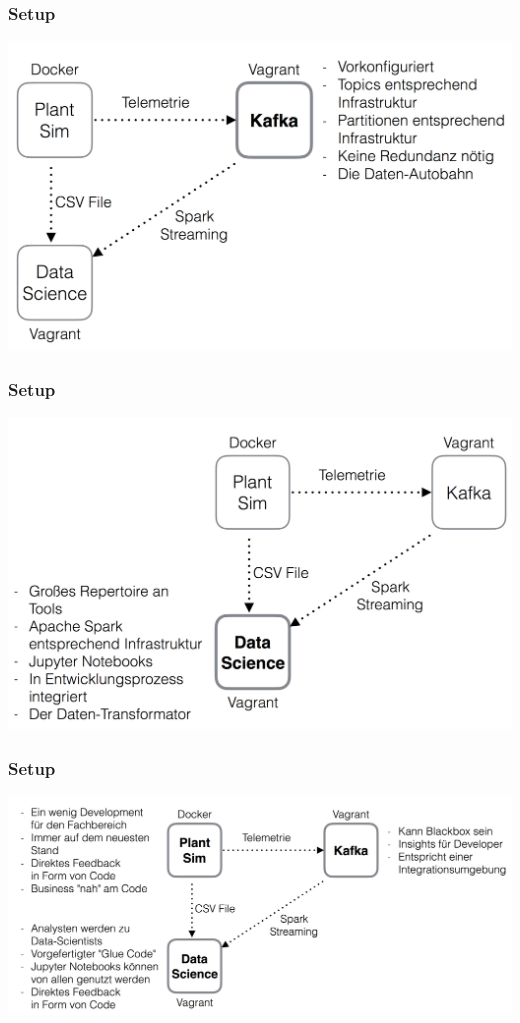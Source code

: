\begin{frame}
\frametitle{Setup}
  \center
  \includegraphics[width=1\textwidth,
  keepaspectratio=true]{bilder/data_science_kafka.png}
\end{frame}

\begin{frame}
\frametitle{Setup}
  \center
  \includegraphics[width=1\textwidth,
  keepaspectratio=true]{bilder/data_science_spark.png}
\end{frame}

\begin{frame}
\frametitle{Setup}
  \center
  \includegraphics[width=1\textwidth,
  keepaspectratio=true]{bilder/data_science_all.png}
\end{frame}
